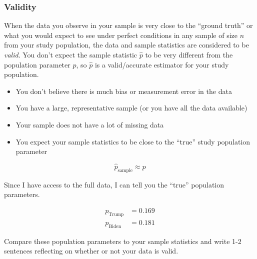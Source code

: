 \documentclass[
  letterpaper,
  DIV=11,
  numbers=noendperiod]{scrartcl}
\begin{document}
\subsubsection{Validity}\label{validity}

When the data you observe in your sample is very close to the ``ground
truth'' or what you would expect to see under perfect conditions in any
sample of size \(n\) from your study population, the data and sample
statistics are considered to be \emph{valid}. You don't expect the
sample statistic \(\hat{p}\) to be very different from the population
parameter \(p\), so \(\hat{p}\) is a valid/accurate estimator for your
study population.

\begin{itemize}
\item
  You don't believe there is much bias or measurement error in the data
\item
  You have a large, representative sample (or you have all the data
  available)
\item
  Your sample does not have a lot of missing data
\item
  You expect your sample statistics to be close to the ``true'' study
  population parameter
\end{itemize}

\[\hat{p}_{\text{sample}} \approx p\]

Since I have access to the full data, I can tell you the ``true''
population parameters.

\[
\begin{aligned}
p_{\text{Trump}} &= 0.169 \\
p_{\text{Biden}} &= 0.181
\end{aligned}
\]

Compare these population parameters to your sample statistics and write
1-2 sentences reflecting on whether or not your data is valid.
\end{document}
